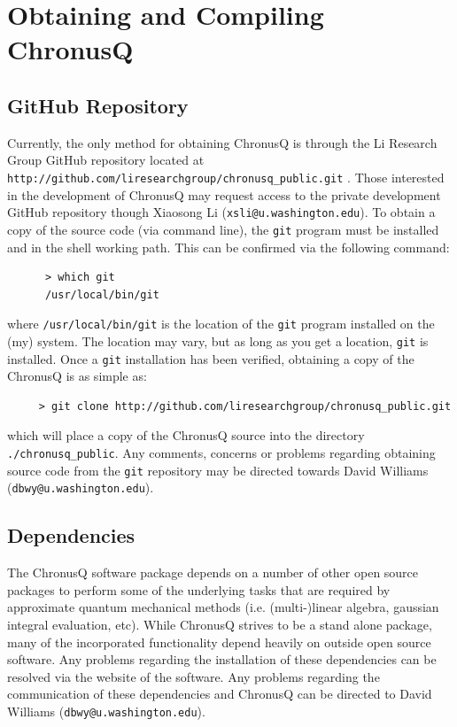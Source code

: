 \documentclass[12pt]{article}
\makeatletter
\newcommand{\ChronusQGitHubPUBLIC}{
  \texttt{http://github.com/liresearchgroup/chronusq\_public.git}
}
\newcommand{\XiaosongContact}{Xiaosong Li (\texttt{xsli@u.washington.edu})}
\newcommand{\DBWYContact}{David Williams (\texttt{dbwy@u.washington.edu})}
\makeatother
\begin{document}
  \section{Obtaining and Compiling ChronusQ} \label{sec:ObtainAndCompile}
    \subsection{GitHub Repository} \label{subsec:ChronusQGitHub}

    Currently, the only method for obtaining ChronusQ is through the Li Research
    Group GitHub repository located at \ChronusQGitHubPUBLIC. Those interested in
    the development of ChronusQ may request access to the private development GitHub
    repository though \XiaosongContact. To obtain a copy of the source code (via 
    command line), the \texttt{git} program must be installed and in the shell 
    working path. This can be confirmed via the following command:

    \begin{lstlisting}
      > which git
      /usr/local/bin/git
    \end{lstlisting}
    where \texttt{/usr/local/bin/git} is the location of the \texttt{git} program 
    installed on the (my) system. The location may vary, but as long as you get a 
    location, \texttt{git} is installed. Once a \texttt{git} installation has been 
    verified, obtaining a copy of the ChronusQ is as simple as:

    \begin{lstlisting}
     > git clone http://github.com/liresearchgroup/chronusq_public.git
    \end{lstlisting}
    which will place a copy of the ChronusQ source into the directory 
    \texttt{./chronusq\_public}. Any comments, concerns or problems regarding 
    obtaining source code from the \texttt{git} repository may be directed 
    towards \DBWYContact. 

    \subsection{Dependencies} \label{subsec:ChronusQDeps}

    The ChronusQ software package depends on a number of other open source packages
    to perform some of the underlying tasks that are required by approximate
    quantum mechanical methods (i.e. (multi-)linear algebra, gaussian integral 
    evaluation, etc). While ChronusQ strives to be a stand alone package, many
    of the incorporated functionality depend heavily on outside open source 
    software. Any problems regarding the installation of these dependencies can
    be resolved via the website of the software. Any problems regarding the
    communication of these dependencies and ChronusQ can be directed to
    \DBWYContact.
    
\end{document}
